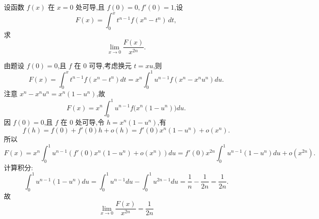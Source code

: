 \begin{questions}

    \question 设函数 \( f(x) \) 在 \( x = 0 \) 处可导,且 \( f(0) = 0, f'(0) = 1 \),设
    \[
    F(x) = \int_0^x t^{n-1} f(x^n - t^n) \, dt,
    \]
    求
    \[
    \lim_{x \to 0} \frac{F(x)}{x^{2n}}.
    \]
    \begin{solution}
        由题设 \( f(0) = 0 \),且 \( f \) 在 0 可导,考虑换元 \( t = x u \),则
        \[
        F(x) = \int_0^x t^{n-1} f(x^n - t^n) dt = x^n \int_0^1 u^{n-1} f(x^n - x^n u^n) du.
        \]
        注意 \( x^n - x^n u^n = x^n(1 - u^n) \),故
        \[
        F(x) = x^n \int_0^1 u^{n-1} f\big(x^n(1 - u^n)\big) du.
        \]
        因 \( f(0) = 0 \),且 \( f \) 在 0 处可导,令 \( h = x^n(1 - u^n) \),有
        \[
        f(h) = f(0) + f'(0) h + o(h) = f'(0)x^n(1 - u^n) + o(x^n).
        \]
        所以
        \[
        F(x) = x^n \int_0^1 u^{n-1} \left( f'(0)x^n(1 - u^n) + o(x^n) \right) du
        = f'(0)x^{2n} \int_0^1 u^{n-1}(1 - u^n) du + o(x^{2n}).
        \]
        计算积分:
        \[
        \int_0^1 u^{n-1}(1 - u^n) du = \int_0^1 u^{n-1} du - \int_0^1 u^{2n-1} du = \frac{1}{n} - \frac{1}{2n} = \frac{1}{2n}.
        \]
        故
        \[
        \lim_{x \to 0} \frac{F(x)}{x^{2n}} = \frac{1}{2n}
        \]
    \end{solution}


\end{questions}
